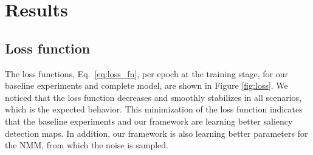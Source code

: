 \documentclass{article}
\begin{document}
\section{Results}

\subsection{Loss function}

The loss functions, Eq.~\eqref{eq:loss_fn}, per epoch at the training stage, for our baseline experiments and complete model, are shown in Figure \ref{fig:loss}. We noticed that the loss function decreases and smoothly stabilizes in all scenarios, which is the expected behavior. This minimization of the loss function indicates that the baseline experiments and our framework are learning better saliency detection maps. In addition, our framework is also learning better parameters for the NMM, from which the noise is sampled.
\end{document}
